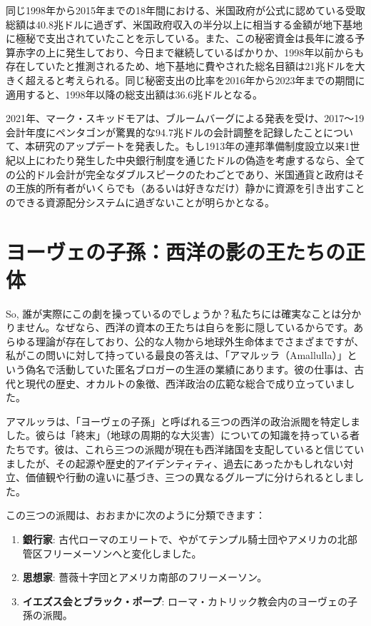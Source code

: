 \documentclass[10pt,twocolumn,letterpaper]{article}
\begin{document}
同じ1998年から2015年までの18年間における、米国政府が公式に認めている受取総額は40.8兆ドルに過ぎず\cite{15}、米国政府収入の半分以上に相当する金額が地下基地に極秘で支出されていたことを示している。また、この秘密資金は長年に渡る予算赤字の上に発生しており、今日まで継続しているばかりか、1998年以前からも存在していたと推測されるため、地下基地に費やされた総名目額は21兆ドルを大きく超えると考えられる。同じ秘密支出の比率を2016年から2023年までの期間に適用すると、1998年以降の総支出額は36.6兆ドルとなる。

2021年、マーク・スキッドモアは、ブルームバーグによる発表を受け、2017～19会計年度にペンタゴンが驚異的な94.7兆ドルの会計調整を記録したことについて、本研究のアップデートを発表した\cite{17,18}。もし1913年の連邦準備制度設立以来1世紀以上にわたり発生した中央銀行制度を通じたドルの偽造を考慮するなら\cite{37}、全ての公的ドル会計が完全なダブルスピークのたわごとであり、米国通貨と政府はその王族的所有者がいくらでも（あるいは好きなだけ）静かに資源を引き出すことのできる資源配分システムに過ぎないことが明らかとなる。

\section{ヨーヴェの子孫：西洋の影の王たちの正体}
So, 誰が実際にこの劇を操っているのでしょうか？私たちには確実なことは分かりません。なぜなら、西洋の資本の王たちは自らを影に隠しているからです。あらゆる理論が存在しており、公的な人物から地球外生命体までさまざまですが、私がこの問いに対して持っている最良の答えは、「アマルッラ（Amallulla）」という偽名で活動していた匿名ブロガーの生涯の業績にあります。彼の仕事は、古代と現代の歴史、オカルトの象徴、西洋政治の広範な総合で成り立っていました\cite{33,34}。

アマルッラは、「ヨーヴェの子孫」と呼ばれる三つの西洋の政治派閥を特定しました。彼らは「終末」（地球の周期的な大災害）についての知識を持っている者たちです。彼は、これら三つの派閥が現在も西洋諸国を支配していると信じていましたが、その起源や歴史的アイデンティティ、過去にあったかもしれない対立、価値観や行動の違いに基づき、三つの異なるグループに分けられるとしました。

この三つの派閥は、おおまかに次のように分類できます：

\begin{flushleft}
\begin{enumerate}
    \item \textbf{銀行家}: 古代ローマのエリートで、やがてテンプル騎士団やアメリカの北部管区フリーメーソンへと変化しました。
    \item \textbf{思想家}: 薔薇十字団とアメリカ南部のフリーメーソン。
    \item \textbf{イエズス会とブラック・ポープ}: ローマ・カトリック教会内のヨーヴェの子孫の派閥。
\end{enumerate}
\end{flushleft}
\end{document}

